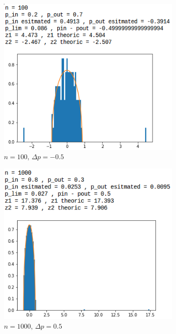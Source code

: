 \begin{figure}[p]
\begin{subfigure}{.5\textwidth}
		\centering
		\includegraphics[scale=0.58]{static/spectral_n100_pin02_pout07.png}
		\caption{$n=100$, $\Delta p=-0.5$}
		\label{n100delta-05}
	\end{subfigure}
	\begin{subfigure}{.5\textwidth}
		\centering
		\includegraphics[scale=0.58]{static/spectral_n1000_pin08_pout03.png}
		\caption{$n=1000$, $\Delta p=0.5$}
		\label{n1000delta05}
	\end{subfigure}
	\begin{subfigure}{.5\textwidth}
		\centering

\end{subfigure}
\end{figure}
